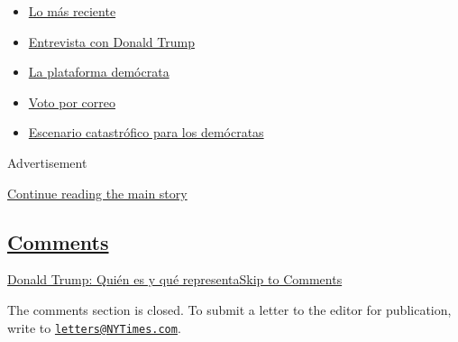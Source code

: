 \begin{itemize}
\tightlist
\item
  \href{https://www.nytimes3xbfgragh.onion/es/2020/09/07/espanol/estados-unidos/trump-biden-encuestas-elecciones.html?name=styln-elections-es\&region=TOP_BANNER\&block=storyline_menu_recirc\&action=click\&pgtype=Interactive\&impression_id=485ec8b1-f1d9-11ea-a843-dd2d420313bb\&variant=undefined}{Lo
  más reciente}
\item
  \href{https://www.nytimes3xbfgragh.onion/es/2020/08/31/espanol/estados-unidos/donald-trump.html?name=styln-elections-es\&region=TOP_BANNER\&block=storyline_menu_recirc\&action=click\&pgtype=Interactive\&impression_id=485eefc0-f1d9-11ea-a843-dd2d420313bb\&variant=undefined}{Entrevista
  con Donald Trump}
\item
  \href{https://www.nytimes3xbfgragh.onion/es/2020/08/21/espanol/estados-unidos/plataforma-democratas-espanol.html?name=styln-elections-es\&region=TOP_BANNER\&block=storyline_menu_recirc\&action=click\&pgtype=Interactive\&impression_id=485eefc1-f1d9-11ea-a843-dd2d420313bb\&variant=undefined}{La
  plataforma demócrata}
\item
  \href{https://www.nytimes3xbfgragh.onion/es/article/voto-por-correo.html?name=styln-elections-es\&region=TOP_BANNER\&block=storyline_menu_recirc\&action=click\&pgtype=Interactive\&impression_id=485eefc2-f1d9-11ea-a843-dd2d420313bb\&variant=undefined}{Voto
  por correo}
\item
  \href{https://www.nytimes3xbfgragh.onion/es/2020/09/04/espanol/estados-unidos/elecciones-estados-unidos.html?name=styln-elections-es\&region=TOP_BANNER\&block=storyline_menu_recirc\&action=click\&pgtype=Interactive\&impression_id=485eefc3-f1d9-11ea-a843-dd2d420313bb\&variant=undefined}{Escenario
  catastrófico para los demócratas}
\end{itemize}

Advertisement

\protect\hyperlink{after-top}{Continue reading the main story}

\hypertarget{comments}{%
\subsection{\texorpdfstring{\protect\hyperlink{commentsContainer}{Comments}}{Comments}}\label{comments}}

\href{}{Donald Trump: Quién es y qué representa}\href{}{Skip to
Comments}

The comments section is closed. To submit a letter to the editor for
publication, write to
\href{mailto:letters@NYTimes.com}{\nolinkurl{letters@NYTimes.com}}.

